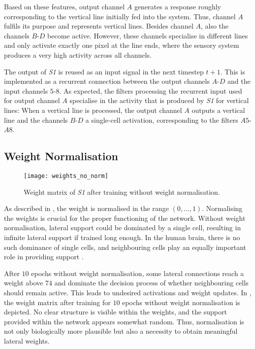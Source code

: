 Based on these features, output channel $A$ generates a response roughly corresponding to the vertical line initially fed into the system.
Thus, channel $A$ fulfils its purpose and represents vertical lines.
Besides channel $A$, also the channels $B$-$D$ become active.
However, these channels specialise in different lines and only activate exactly one pixel at the line ends, where the sensory system produces a very high activity across all channels.

The output of \emph{S1} is reused as an input signal in the next timestep $t+1$.
This is implemented as a recurrent connection between the output channels $A$-$D$ and the input channels $5$-$8$.
As expected, the filters processing the recurrent input used for output channel $A$ specialise in the activity that is produced by \emph{S1} for vertical lines:
When a vertical line is processed, the output channel $A$ outputs a vertical line and the channels $B$-$D$ a single-cell activation, corresponding to the filters $A5$-$A8$.


\subsection{Weight Normalisation}
%
\begin{figure}[h]
    \centering
    \texttt{[image: weights\_no\_norm]}
    \caption[Weights after training without normalisation]{Weight matrix of \emph{S1} after training without weight normalisation.}
\end{figure}
%
As described in , the weight is normalised in the range $(0, ..., 1)$.
Normalising the weights is crucial for the proper functioning of the network. Without weight normalisation, lateral support could be dominated by a single cell, resulting in infinite lateral support if trained long enough. In the human brain, there is no such dominance of single cells, and neighbouring cells play an equally important role in providing support .

After $10$ epochs without weight normalisation, some lateral connections reach a weight above $74$ and dominate the decision process of whether neighbouring cells should remain active.
This leads to undesired activations and weight updates. 
In , the weight matrix after training for $10$ epochs without weight normalisation is depicted.
No clear structure is visible within the weights, and the support provided within the network appears somewhat random. 
Thus, normalisation is not only biologically more plausible but also a necessity to obtain meaningful lateral weights.



